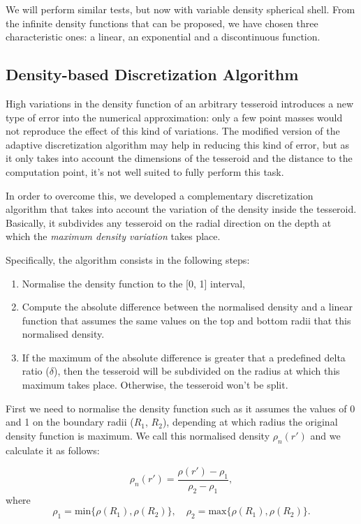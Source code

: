 \documentclass[extra]{gji}
\begin{document}
We will perform similar tests, but now with variable density spherical shell.
From the infinite density functions that can be proposed, we have chosen three characteristic ones: a linear, an exponential and a discontinuous function.

\subsection{Density-based Discretization Algorithm}

High variations in the density function of an arbitrary tesseroid introduces a new type of error into the numerical approximation: only a few point masses would not reproduce the effect of this kind of variations.
The modified version of the adaptive discretization algorithm may help in reducing this kind of error, but as it only takes into account the dimensions of the tesseroid and the distance to the computation point, it's not well suited to fully perform this task.

In order to overcome this, we developed a complementary discretization algorithm that takes into account the variation of the density inside the tesseroid.
Basically, it subdivides any tesseroid on the radial direction on the depth at which the \emph{maximum density variation} takes place.

Specifically, the algorithm consists in the following steps:

\begin{enumerate}
\renewcommand{\theenumi}{(\arabic{enumi})}
    \item Normalise the density function to the [0, 1] interval,
    \item Compute the absolute difference between the normalised density and a linear function that assumes the same values on the top and bottom radii that this normalised density.
    \item If the maximum of the absolute difference is greater that a predefined delta ratio ($\delta$), then the tesseroid will be subdivided on the radius at which this maximum takes place. Otherwise, the tesseroid won't be split.
\end{enumerate}

First we need to normalise the density function such as it assumes the values of 0 and 1 on the boundary radii ($R_1$, $R_2$), depending at which radius the original density function is maximum.
We call this normalised density $\rho_n(r')$ and we calculate it as follows:

\begin{equation}
    \rho_n(r') = \frac{\rho(r') - \rho_1}{\rho_2 - \rho_1},
\end{equation}
\noindent where
\begin{equation}
    \rho_1 = \text{min}\{ \rho(R_1), \rho(R_2) \}, \quad
    \rho_2 = \text{max}\{ \rho(R_1), \rho(R_2) \}.
\end{equation}
\end{document}
